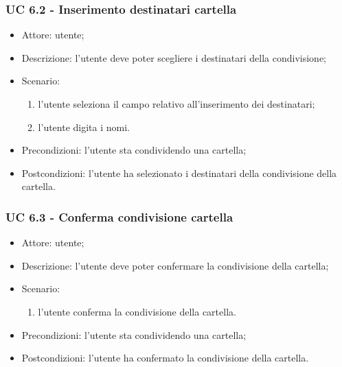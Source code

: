     \subsubsection{UC 6.2 - Inserimento destinatari cartella}
    \begin{itemize}
        \item Attore: utente;
        \item Descrizione: l'utente deve poter scegliere i destinatari della condivisione;
        \item Scenario:
        \begin{enumerate}
        \item l'utente seleziona il campo relativo all'inserimento dei destinatari;
        \item l'utente digita i nomi.
        \end{enumerate}
        \item Precondizioni: l'utente sta condividendo una cartella;
        \item Postcondizioni: l'utente ha selezionato i destinatari della condivisione della cartella.
    \end{itemize}
    
    \subsubsection{UC 6.3 - Conferma condivisione cartella}
    \begin{itemize}
        \item Attore: utente;
        \item Descrizione: l'utente deve poter confermare la condivisione della cartella;
        \item Scenario:
        \begin{enumerate}
        \item l'utente conferma la condivisione della cartella.
        \end{enumerate}
        \item Precondizioni: l'utente sta condividendo una cartella;
        \item Postcondizioni: l'utente ha confermato la condivisione della cartella.
    \end{itemize}

